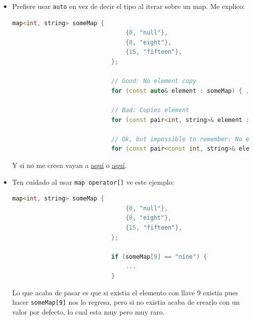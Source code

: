 \documentclass[12pt, fleqn]{report}                             %
\theoremstyle{break}                                            %
\newcommand{\textCode}[1]  { \texttt{#1} }                      %
\begin{document}
                \begin{itemize}
                    \item 
                        Prefiere usar \textCode{auto} en vez de decir el tipo al iterar sobre un map.
                        Me explico:
                        \begin{lstlisting}[language=C++, gobble=28]
                            map<int, string> someMap {
                                {0, "null"},
                                {8, "eight"},
                                {15, "fifteen"},
                            };
                            
                            // Good: No element copy
                            for (const auto& element : someMap) { ... } 
                            
                            // Bad: Copies element
                            for (const pair<int, string>& element : someMap) {...}   

                            // Ok, but impossible to remember: No element copy
                            for (const pair<const int, string>& element : someMap) {...}  
                        \end{lstlisting}

                        Y si no me creen vayan a \underline{\href{https://wandbox.org/permlink/4IFbZr72RfUUWyCz}{aquí}}
                        o \underline{\href{https://releases.llvm.org/7.0.0/tools/clang/tools/extra/docs/clang-tidy/checks/performance-implicit-conversion-in-loop.html}{aquí}}.

                        \cite{NicoJosuttis}

                    \item 
                        Ten cuidado al usar \textCode{map operator[]} ve este ejemplo:
                        \begin{lstlisting}[language=C++, gobble=28]
                            map<int, string> someMap {
                                {0, "null"},
                                {8, "eight"},
                                {15, "fifteen"},
                            };
                            
                            if (someMap[9] == "nine") {   
                                ...
                            }
                        \end{lstlisting}

                        Lo que acaba de pasar es que si existia el elemento con llave 9 existia pues hacer
                        \textCode{someMap[9]} nos lo regresa, pero si no existia acaba de crearlo con un valor
                        por defecto, lo cual esta muy pero muy raro.


\end{itemize}
\end{document}
